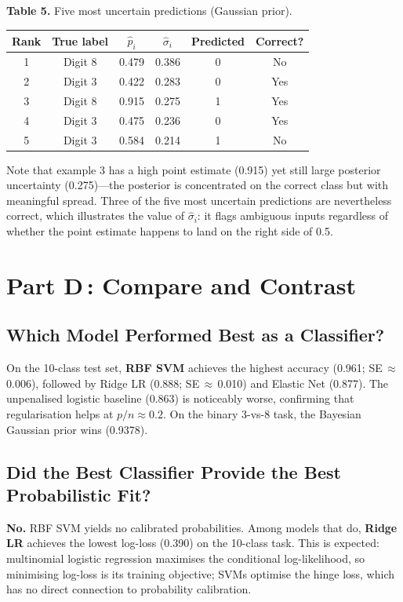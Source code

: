 \documentclass[10pt, letterpaper]{article}
\begin{document}
\begin{center}\small
\textbf{Table 5.} Five most uncertain predictions (Gaussian prior).\\[4pt]
\renewcommand{\arraystretch}{1.2}
\begin{tabular}{@{}cccccc@{}}
\toprule
Rank & True label & $\hat{p}_i$ & $\hat{\sigma}_i$ & Predicted & Correct? \\
\midrule
1 & Digit 8 & 0.479 & 0.386 & 0 & No \\
2 & Digit 3 & 0.422 & 0.283 & 0 & Yes \\
3 & Digit 8 & 0.915 & 0.275 & 1 & Yes \\
4 & Digit 3 & 0.475 & 0.236 & 0 & Yes \\
5 & Digit 3 & 0.584 & 0.214 & 1 & No \\
\bottomrule
\end{tabular}
\end{center}

Note that example 3 has a high point estimate (0.915) yet still large posterior uncertainty (0.275)---the posterior is concentrated on the correct class but with meaningful spread. Three of the five most uncertain predictions are nevertheless correct, which illustrates the value of $\hat{\sigma}_i$: it flags ambiguous inputs regardless of whether the point estimate happens to land on the right side of 0.5.

\section{Part D\,: Compare and Contrast}

\subsection{Which Model Performed Best as a Classifier?}
On the 10-class test set, \textbf{RBF SVM} achieves the highest accuracy (0.961; SE\,$\approx$\,0.006), followed by Ridge LR (0.888; SE\,$\approx$\,0.010) and Elastic Net (0.877). The unpenalised logistic baseline (0.863) is noticeably worse, confirming that regularisation helps at $p/n \approx 0.2$. On the binary 3-vs-8 task, the Bayesian Gaussian prior wins (0.9378).

\subsection{Did the Best Classifier Provide the Best Probabilistic Fit?}
\textbf{No.} RBF SVM yields no calibrated probabilities. Among models that do, \textbf{Ridge LR} achieves the lowest log-loss (0.390) on the 10-class task. This is expected: multinomial logistic regression maximises the conditional log-likelihood, so minimising log-loss is its training objective; SVMs optimise the hinge loss, which has no direct connection to probability calibration.
\end{document}
